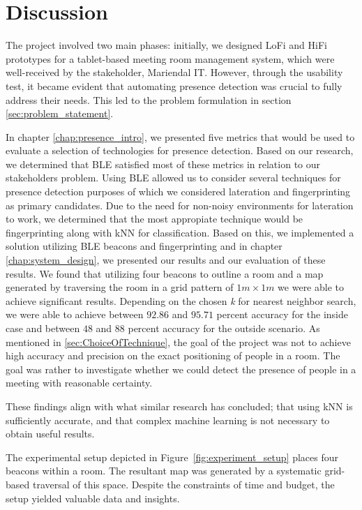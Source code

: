 \chapter{Discussion}\label{chap:discussion}
The project involved two main phases: initially, we designed LoFi and HiFi prototypes for a tablet-based meeting room management system, which were well-received by the stakeholder, Mariendal IT.
However, through the usability test, it became evident that automating presence detection was crucial to fully address their needs.
This led to the problem formulation in section \ref{sec:problem_statement}.

In chapter \ref{chap:presence_intro}, we presented five metrics that would be used to evaluate a selection of technologies for presence detection.
Based on our research, we determined that BLE satisfied most of these metrics in relation to our stakeholders problem.
Using BLE allowed us to consider several techniques for presence detection purposes of which we considered lateration and fingerprinting as primary candidates.
Due to the need for non-noisy environments for lateration to work, we determined that the most appropiate technique would be fingerprinting along with kNN for classification.
Based on this, we implemented a solution utilizing BLE beacons and fingerprinting and in chapter \ref{chap:system_design}, we presented our results and our evaluation of these results. 
We found that utilizing four beacons to outline a room and a map generated by traversing the room in a grid pattern of $1m \times 1m$ we were able to achieve significant results.
Depending on the chosen \textit{k} for nearest neighbor search, we were able to achieve between $92.86$ and $95.71$ percent accuracy for the inside case and between $48$ and $88$ percent accuracy for the outside scenario. 
As mentioned in \ref{sec:ChoiceOfTechnique}, the goal of the project was not to achieve high accuracy and precision on the exact positioning of people in a room. 
The goal was rather to investigate whether we could detect the presence of people in a meeting with reasonable certainty.

These findings align with what similar research has concluded; that using kNN is sufficiently accurate, and that complex machine learning is not necessary to obtain useful results.\cite{ble_kneares_neural}

The experimental setup depicted in Figure~\ref{fig:experiment_setup} places four beacons within a room.
The resultant map was generated by a systematic grid-based traversal of this space.
Despite the constraints of time and budget, the setup yielded valuable data and insights.

